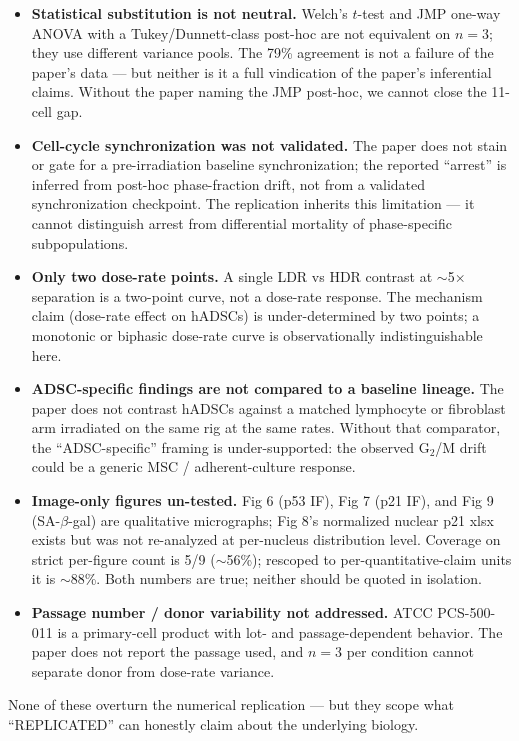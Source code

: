 \documentclass[11pt]{article}
\begin{document}
\begin{itemize}
  \item \textbf{Statistical substitution is not neutral.} Welch's $t$-test and JMP one-way ANOVA
  with a Tukey/Dunnett-class post-hoc are not equivalent on $n{=}3$; they use different variance
  pools. The 79\% agreement is not a failure of the paper's data --- but neither is it a full
  vindication of the paper's inferential claims. Without the paper naming the JMP post-hoc, we
  cannot close the 11-cell gap.
  \item \textbf{Cell-cycle synchronization was not validated.} The paper does not stain or gate
  for a pre-irradiation baseline synchronization; the reported ``arrest'' is inferred from post-hoc
  phase-fraction drift, not from a validated synchronization checkpoint. The replication inherits
  this limitation --- it cannot distinguish arrest from differential mortality of phase-specific
  subpopulations.
  \item \textbf{Only two dose-rate points.} A single LDR vs HDR contrast at $\sim$5$\times$
  separation is a two-point curve, not a dose-rate response. The mechanism claim (dose-rate effect
  on hADSCs) is under-determined by two points; a monotonic or biphasic dose-rate curve is
  observationally indistinguishable here.
  \item \textbf{ADSC-specific findings are not compared to a baseline lineage.} The paper does not
  contrast hADSCs against a matched lymphocyte or fibroblast arm irradiated on the same rig at the
  same rates. Without that comparator, the ``ADSC-specific'' framing is under-supported: the
  observed G$_2$/M drift could be a generic MSC / adherent-culture response.
  \item \textbf{Image-only figures un-tested.} Fig 6 (p53 IF), Fig 7 (p21 IF), and Fig 9
  (SA-$\beta$-gal) are qualitative micrographs; Fig 8's normalized nuclear p21 xlsx exists but was
  not re-analyzed at per-nucleus distribution level. Coverage on strict per-figure count is 5/9
  ($\sim$56\%); rescoped to per-quantitative-claim units it is $\sim$88\%. Both numbers are true;
  neither should be quoted in isolation.
  \item \textbf{Passage number / donor variability not addressed.} ATCC PCS-500-011 is a
  primary-cell product with lot- and passage-dependent behavior. The paper does not report the
  passage used, and $n{=}3$ per condition cannot separate donor from dose-rate variance.
\end{itemize}

None of these overturn the numerical replication --- but they scope what ``REPLICATED'' can honestly
claim about the underlying biology.


\end{document}
